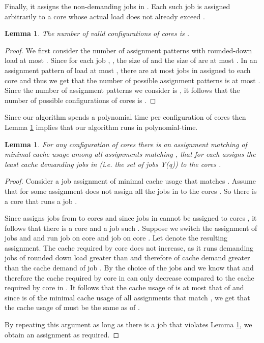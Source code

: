 \documentclass[11pt]{article}
\newtheorem{lemma}[theorem]{Lemma}
\begin{document}
Finally, it assigns the non-demanding jobs in .
Each such job is assigned arbitrarily to a core whose actual load does not already exceed .

\begin{lemma}\label{ptas_poly}
The number of  valid configurations of cores is .
\end{lemma}
\begin{proof}
We first consider the number of assignment patterns with rounded-down load at most .
Since for each job , , the size of  and the size of  are at most .
In an assignment pattern of load at most , there are at most  jobs in  assigned to each core and thus we get that the number of possible assignment patterns is at most .
Since the number of assignment patterns we consider is , it follows that the number of possible configurations of cores is .
\end{proof}

Since our algorithm spends a polynomial time per configuration of cores then Lemma \ref{ptas_poly} implies that our algorithm runs in polynomial-time.

\begin{lemma}\label{take_smallest}
For any configuration of cores  there is an assignment matching  of minimal cache usage among all assignments matching , that for each  assigns the  least cache demanding jobs in  (i.e. the set of jobs Y(q)) to the cores .
\end{lemma}
\begin{proof}
Consider a job assignment  of minimal cache usage that matches .
Assume that for some  assignment  does not assign all the jobs in  to the cores .
So there is a core  that runs a job .

Since  assigns  jobs from  to cores  and since jobs in  cannot be assigned to cores , it follows that there is a core  and a job  such .
Suppose we switch the assignment of jobs  and  and run job  on core  and job  on core . Let  denote the resulting assignment.
The cache required by core  does not increase, as it runs demanding jobs of rounded down load greater than  and therefore of cache demand greater than the cache demand of job .
By the choice of the jobs  and  we know that  and therefore the cache required by core  in  can only decrease compared to the cache required by core  in .
It follows that the cache usage of  is at most that of  and since  is of the minimal cache usage of all assignments that match , we get that the cache usage of  must be the same as of .

By repeating this argument as long as there is a job that violates Lemma \ref{take_smallest}, we obtain an assignment as required.
\end{proof}
\end{document}
